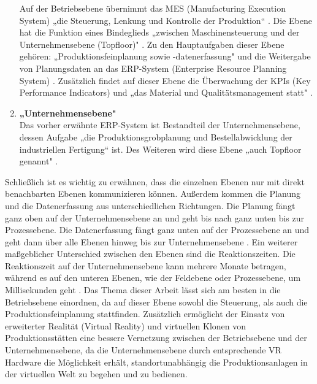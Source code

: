 \begin{enumerate}
	Auf der Betriebsebene übernimmt das MES (Manufacturing Execution System) „die Steuerung, Lenkung und Kontrolle der Produktion“ \cite[S.50]{14}. Die Ebene hat die Funktion eines Bindeglieds „zwischen Maschinensteuerung und der Unternehmensebene (Topfloor)" \cite[S.50]{14}. Zu den Hauptaufgaben dieser Ebene gehören: „Produktionsfeinplanung sowie -datenerfassung" \cite[S.50]{14} und die Weitergabe von Planungsdaten an das ERP-System (Enterprise Resource Planning System) \cite[S.50]{14}.  Zusätzlich findet auf dieser Ebene die Überwachung der KPIs (Key Performance Indicators) und „das Material und Qualitätsmanagement statt" \cite[S.405]{15}.
	\item \textbf{„Unternehmensebene"} \cite[S.50]{14} \\
	Das vorher erwähnte ERP-System ist Bestandteil der Unternehmensebene, dessen Aufgabe „die Produktionsgrobplanung und Bestellabwicklung der industriellen Fertigung“ \cite[S.50]{14} ist. Des Weiteren wird diese Ebene „auch Topfloor genannt" \cite[S.50]{14}.
\end{enumerate}
Schließlich ist es wichtig zu erwähnen, dass die einzelnen Ebenen nur mit direkt benachbarten Ebenen kommunizieren können. Außerdem kommen die Planung und die Datenerfassung aus unterschiedlichen Richtungen. Die Planung fängt ganz oben auf der Unternehmensebene an und geht bis nach ganz unten bis zur Prozessebene. Die Datenerfassung fängt ganz unten auf der Prozessebene an und geht dann über alle Ebenen hinweg bis zur Unternehmensebene \cite[S.50]{14}. Ein weiterer maßgeblicher Unterschied zwischen den Ebenen sind die Reaktionszeiten. Die Reaktionszeit auf der Unternehmensebene kann mehrere Monate betragen, während es auf den unteren Ebenen, wie der Feldebene oder Prozessebene, um Millisekunden geht \cite[S.123]{16}.
\newline
Das Thema dieser Arbeit lässt sich am besten in die Betriebsebene einordnen, da auf dieser Ebene sowohl die Steuerung, als auch die Produktionsfeinplanung stattfinden. Zusätzlich ermöglicht der Einsatz von erweiterter Realität (Virtual Reality) und virtuellen Klonen von Produktionsstätten eine bessere Vernetzung zwischen der Betriebsebene und der Unternehmensebene, da die Unternehmensebene durch entsprechende VR Hardware die Möglichkeit erhält, standortunabhängig die Produktionsanlagen in der virtuellen Welt zu begehen und zu bedienen.

